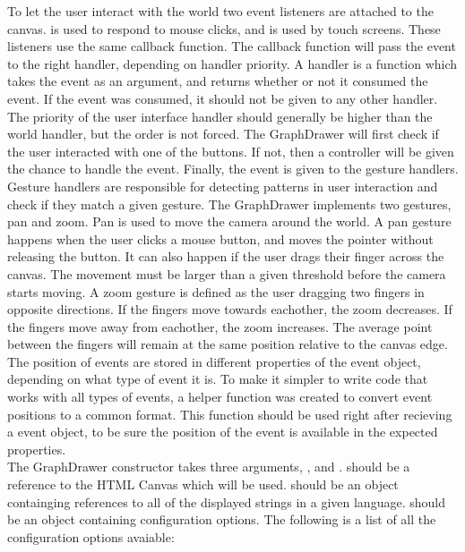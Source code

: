 To let the user interact with the world two event listeners are attached to the canvas.  is used to respond to mouse clicks, and  is used by touch screens. These listeners use the same callback function. The callback function will pass the event to the right handler, depending on handler priority. A handler is a function which takes the event as an argument, and returns whether or not it consumed the event. If the event was consumed, it should not be given to any other handler. The priority of the user interface handler should generally be higher than the world handler, but the order is not forced. The GraphDrawer will first check if the user interacted with one of the buttons. If not, then a controller will be given the chance to handle the event. Finally, the event is given to the gesture handlers. Gesture handlers are responsible for detecting patterns in user interaction and check if they match a given gesture. The GraphDrawer implements two gestures, pan and zoom. Pan is used to move the camera around the world. A pan gesture happens when the user clicks a mouse button, and moves the pointer without releasing the button. It can also happen if the user drags their finger across the canvas. The movement must be larger than a given threshold before the camera starts moving. A zoom gesture is defined as the user dragging two fingers in opposite directions. If the fingers move towards eachother, the zoom decreases. If the fingers move away from eachother, the zoom increases. The average point between the fingers will remain at the same position relative to the canvas edge. The position of events are stored in different properties of the event object, depending on what type of event it is. To make it simpler to write code that works with all types of events, a helper function  was created to convert event positions to a common format. This function should be used right after recieving a event object, to be sure the position of the event is available in the expected properties.
\\[11pt]
The GraphDrawer constructor takes three arguments, ,  and .  should be a reference to the HTML Canvas which will be used.  should be an object containging references to all of the displayed strings in a given language.  should be an object containing configuration options. The following is a list of all the configuration options avaiable:
